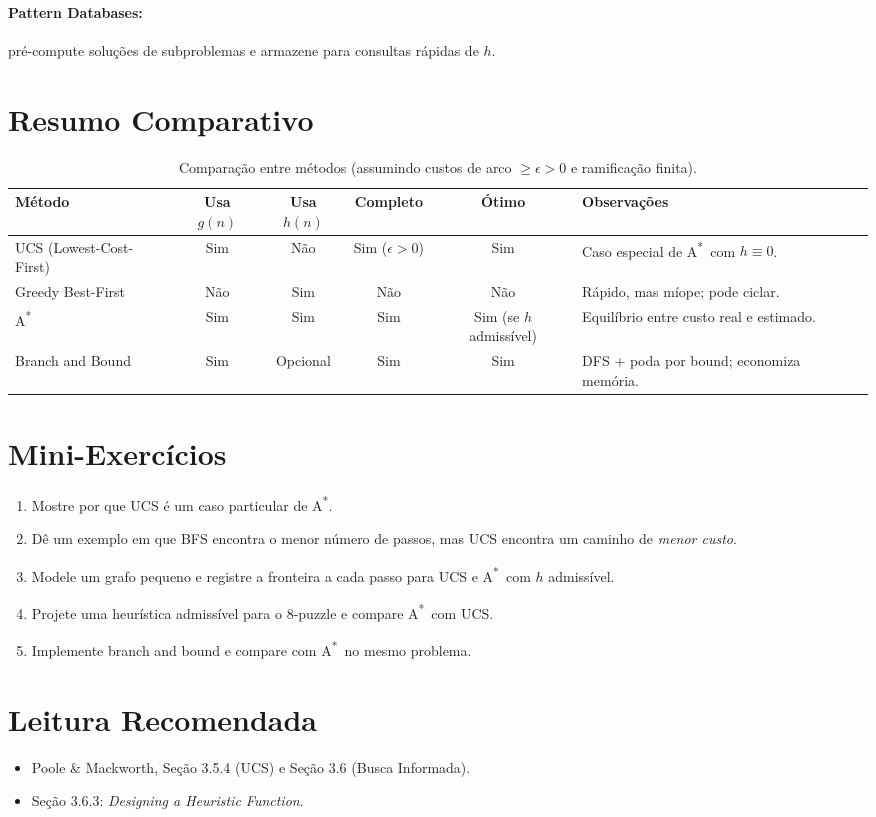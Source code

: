 \documentclass[9pt,a4paper]{extarticle}
\newcommand{\Astar}{A\textsuperscript{*}}
\begin{document}
\paragraph{Pattern Databases:} pré-compute soluções de subproblemas e armazene para consultas rápidas de $h$.

\section{Resumo Comparativo}

\begin{table}[H]
\centering
\small
\setlength{\tabcolsep}{4pt}
\renewcommand{\arraystretch}{1.2}
\begin{tabular}{@{}lccccp{5.2cm}@{}}
\toprule
\textbf{Método} & \textbf{Usa $g(n)$} & \textbf{Usa $h(n)$} & \textbf{Completo} & \textbf{Ótimo} & \textbf{Observações} \\
\midrule
UCS (Lowest-Cost-First) & Sim & Não & Sim ($\epsilon>0$) & Sim & Caso especial de \Astar\ com $h\equiv 0$. \\
Greedy Best-First       & Não & Sim & Não               & Não & Rápido, mas míope; pode ciclar. \\
\Astar                  & Sim & Sim & Sim               & Sim (se $h$ admissível) & Equilíbrio entre custo real e estimado. \\
Branch and Bound        & Sim & Opcional & Sim         & Sim & DFS + poda por bound; economiza memória. \\
\bottomrule
\end{tabular}
\caption{Comparação entre métodos (assumindo custos de arco $\ge \epsilon>0$ e ramificação finita).}
\end{table}

\section*{Mini-Exercícios}

\begin{enumerate}
  \item Mostre por que UCS é um caso particular de \Astar.
  \item Dê um exemplo em que BFS encontra o menor número de passos, mas UCS encontra um caminho de \emph{menor custo}.
  \item Modele um grafo pequeno e registre a fronteira a cada passo para UCS e \Astar\ com $h$ admissível.
  \item Projete uma heurística admissível para o 8-puzzle e compare \Astar\ com UCS.
  \item Implemente branch and bound e compare com \Astar\ no mesmo problema.
\end{enumerate}

\section*{Leitura Recomendada}
\begin{itemize}
  \item Poole \& Mackworth, Seção 3.5.4 (UCS) e Seção 3.6 (Busca Informada).
  \item Seção 3.6.3: \textit{Designing a Heuristic Function}.
\end{itemize}
\end{document}
